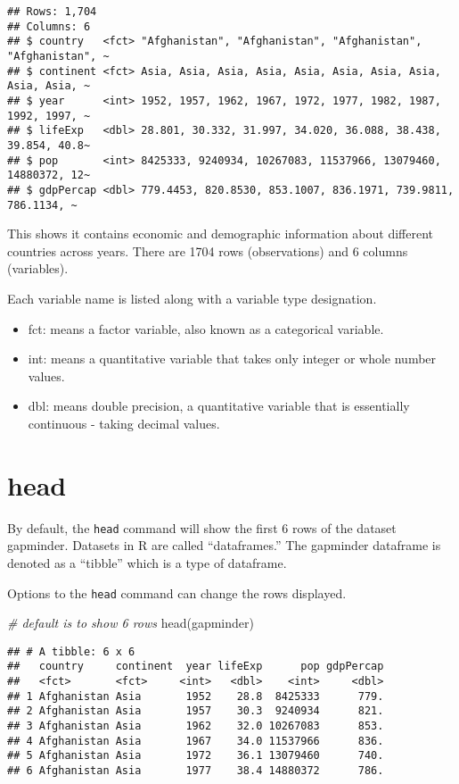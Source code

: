 \documentclass[
]{book}
\newenvironment{Shaded}{\begin{snugshade}}{\end{snugshade}}
\newcommand{\CommentTok}[1]{\textcolor[rgb]{0.56,0.35,0.01}{\textit{#1}}}
\newcommand{\FunctionTok}[1]{\textcolor[rgb]{0.00,0.00,0.00}{#1}}
\newcommand{\NormalTok}[1]{#1}
\providecommand{\tightlist}{%
  \setlength{\itemsep}{0pt}\setlength{\parskip}{0pt}}
\begin{document}
\begin{verbatim}
## Rows: 1,704
## Columns: 6
## $ country   <fct> "Afghanistan", "Afghanistan", "Afghanistan", "Afghanistan", ~
## $ continent <fct> Asia, Asia, Asia, Asia, Asia, Asia, Asia, Asia, Asia, Asia, ~
## $ year      <int> 1952, 1957, 1962, 1967, 1972, 1977, 1982, 1987, 1992, 1997, ~
## $ lifeExp   <dbl> 28.801, 30.332, 31.997, 34.020, 36.088, 38.438, 39.854, 40.8~
## $ pop       <int> 8425333, 9240934, 10267083, 11537966, 13079460, 14880372, 12~
## $ gdpPercap <dbl> 779.4453, 820.8530, 853.1007, 836.1971, 739.9811, 786.1134, ~
\end{verbatim}

This shows it contains economic and demographic information about different countries across years. There are 1704 rows (observations) and 6 columns (variables).

Each variable name is listed along with a variable type designation.

\begin{itemize}
\tightlist
\item
  fct: means a factor variable, also known as a categorical variable.
\item
  int: means a quantitative variable that takes only integer or whole number values.
\item
  dbl: means double precision, a quantitative variable that is essentially continuous - taking decimal values.
\end{itemize}

\hypertarget{head}{%
\section{head}\label{head}}

By default, the \texttt{head} command will show the first 6 rows of the dataset gapminder. Datasets in R are called ``dataframes.'' The gapminder dataframe is denoted as a ``tibble'' which is a type of dataframe.

Options to the \texttt{head} command can change the rows displayed.

\begin{Shaded}
\begin{Highlighting}[]
\CommentTok{\# default is to show 6 rows}
\FunctionTok{head}\NormalTok{(gapminder)}
\end{Highlighting}
\end{Shaded}

\begin{verbatim}
## # A tibble: 6 x 6
##   country     continent  year lifeExp      pop gdpPercap
##   <fct>       <fct>     <int>   <dbl>    <int>     <dbl>
## 1 Afghanistan Asia       1952    28.8  8425333      779.
## 2 Afghanistan Asia       1957    30.3  9240934      821.
## 3 Afghanistan Asia       1962    32.0 10267083      853.
## 4 Afghanistan Asia       1967    34.0 11537966      836.
## 5 Afghanistan Asia       1972    36.1 13079460      740.
## 6 Afghanistan Asia       1977    38.4 14880372      786.
\end{verbatim}
\end{document}
